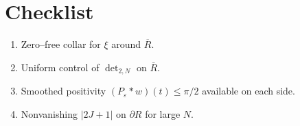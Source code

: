 \documentclass[11pt]{article}
\theoremstyle{remark}
\begin{document}
\section*{Checklist}
\begin{enumerate}
  \item Zero--free collar for $\xi$ around $\overline R$.
  \item Uniform control of $\det_{2,N}$ on $\overline R$.
  \item Smoothed positivity $(P_\varepsilon*w)(t)\le\pi/2$ available on each side.
  \item Nonvanishing $|2J+1|$ on $\partial R$ for large $N$.
\end{enumerate}
\end{document}
